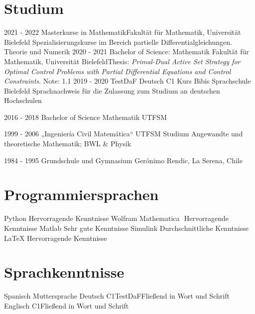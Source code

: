 \documentclass[a4paper]{cv-class}
\begin{document}
\section{Studium}
\begin{entrylist}
\entry
{2021 - 2022}
{Masterkurse in Mathematik}{Fakultät für Mathematik, Universität Bielefeld}{ Spezialisierungskurse im Bereich partielle Differentialgleichungen. Theorie und Numerik}
\entry
{2020 - 2021}
{Bachelor of Science: Mathematik}
{Fakultät für Mathematik, Universität Bielefeld}{Thesis: {\sl Primal-Dual Active Set Strategy for Optimal Control
Problems with Partial Differential Equations and Control Constraints}. Note: 1.1}
\entry
{2019 - 2020}
{TestDaF Deutsch C1 Kurs} 
{Bibis Sprachschule Bielefeld}
{Sprachnachweis für die Zulassung zum Studium an deutschen Hochschulen}


\entry
    {2016 - 2018}
    {Bachelor of Science Mathematik}
    {UTFSM}
    
  \entry
    {1999 - 2006}
    {„Ingenier\'ia Civil Matem\'atica“}
    {UTFSM}
        {Studium Angewandte und theoretische Mathematik; BWL \& Physik}
        
    
\entry
{1984 - 1995}
{Grundschule und Gymnasium}
{Ger\'onimo Rendic, La Serena, Chile}
{}
\end{entrylist}
\section{Programmiersprachen}
\begin{entrylist}
\entry
{Python}
{Hervorragende Kenntnisse}{}{}
\entry
{Wolfram Mathematica\!}
{\,\,Hervorragende Kenntnisse}{}{}
\entry
{Matlab}
{Sehr gute Kenntnisse}{}{}
\entry
{Simulink}
{Durchschnittliche Kenntnisse}{}{}
\entry
{\LaTeX{}}
{Hervorragende Kenntnisse}{}{}
\end{entrylist}
\section{Sprachkenntnisse}
\begin{entrylist}
\entry
{Spanisch}
{Muttersprache}{}{}
\entry
{Deutsch}
{C1}{TestDaF}{Fließend in Wort und Schrift}
\entry
{Englisch}
{C1}{}{Fließend in Wort und Schrift}

\end{entrylist}
\end{document}
